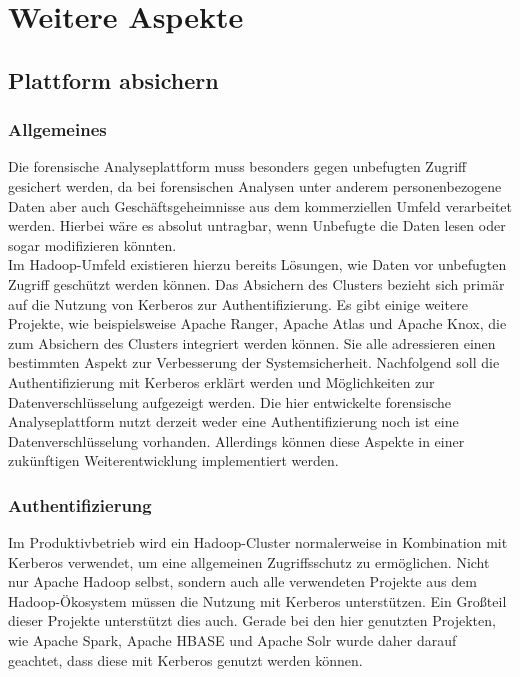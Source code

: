 \chapter{Weitere Aspekte}
\label{ch:additional_aspects}

\section{Plattform absichern}
\label{sec:secure_platform}
\subsection{Allgemeines}
Die forensische Analyseplattform muss besonders gegen unbefugten Zugriff gesichert werden, da bei forensischen Analysen unter anderem personenbezogene Daten aber auch Geschäftsgeheimnisse aus dem kommerziellen Umfeld verarbeitet werden. Hierbei wäre es absolut untragbar, wenn Unbefugte die Daten lesen oder sogar modifizieren könnten.\\

\noindent
Im Hadoop-Umfeld existieren hierzu bereits Lösungen, wie Daten vor unbefugten Zugriff geschützt werden können. Das Absichern des Clusters bezieht sich primär auf die Nutzung von Kerberos zur Authentifizierung. Es gibt einige weitere Projekte, wie beispielsweise Apache Ranger, Apache Atlas und Apache Knox, die zum Absichern des Clusters integriert werden können. Sie alle adressieren einen bestimmten Aspekt zur Verbesserung der Systemsicherheit. Nachfolgend soll die Authentifizierung mit Kerberos erklärt werden und Möglichkeiten zur Datenverschlüsselung aufgezeigt werden. Die hier entwickelte forensische Analyseplattform nutzt derzeit weder eine Authentifizierung noch ist eine Datenverschlüsselung vorhanden. Allerdings können diese Aspekte in einer zukünftigen Weiterentwicklung implementiert werden.

\subsection{Authentifizierung}

Im Produktivbetrieb wird ein Hadoop-Cluster normalerweise in Kombination mit Kerberos verwendet, um eine allgemeinen Zugriffsschutz zu ermöglichen.\cite{hadoop_security} Nicht nur Apache Hadoop selbst, sondern auch alle verwendeten Projekte aus dem Hadoop-Ökosystem müssen die Nutzung mit Kerberos unterstützen. Ein Großteil dieser Projekte unterstützt dies auch. Gerade bei den hier genutzten Projekten, wie Apache Spark, Apache HBASE und Apache Solr wurde daher darauf geachtet, dass diese mit Kerberos genutzt werden können.\\

